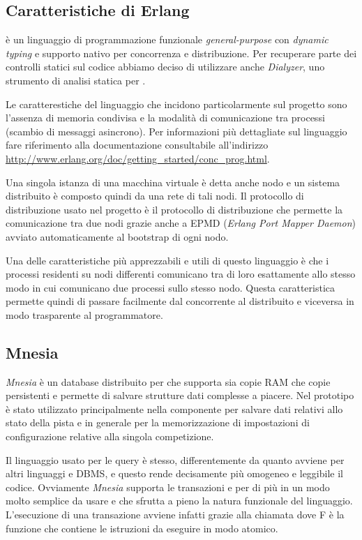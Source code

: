 \subsection*{Caratteristiche di Erlang}
\Erlang{} è un linguaggio di programmazione funzionale \textit{general-purpose} con \textit{dynamic typing} e supporto nativo per concorrenza e distribuzione. Per recuperare parte dei controlli statici sul codice abbiamo deciso di utilizzare anche \textsl{Dialyzer}, uno strumento di analisi statica per \Erlang{}.

Le caratterestiche del linguaggio che incidono particolarmente sul progetto sono l'assenza di memoria condivisa e la modalità di comunicazione tra processi (scambio di messaggi asincrono).
Per informazioni più dettagliate sul linguaggio fare riferimento alla documentazione consultabile all'indirizzo \url{http://www.erlang.org/doc/getting_started/conc_prog.html}.

Una singola istanza di una macchina virtuale \Erlang{} è detta anche nodo \Erlang{} e un sistema \Erlang{} distribuito è composto quindi da una rete di tali nodi. Il protocollo di distribuzione usato nel progetto è il protocollo di distribuzione \Erlang{} che permette la comunicazione tra due nodi \Erlang{} grazie anche a EPMD (\textsl{Erlang Port Mapper Daemon}) avviato automaticamente al bootstrap di ogni nodo.

Una delle caratteristiche più apprezzabili e utili di questo linguaggio è che i processi residenti su nodi differenti comunicano tra di loro esattamente allo stesso modo in cui comunicano due processi sullo stesso nodo. Questa caratteristica permette quindi di passare facilmente dal concorrente al distribuito e viceversa in modo trasparente al programmatore.

\subsection*{Mnesia}
\textsl{Mnesia} è un database distribuito per \Erlang{} che supporta sia copie RAM che copie persistenti e permette di salvare strutture dati complesse a piacere. Nel prototipo è stato utilizzato principalmente nella componente \track{} per salvare dati relativi allo stato della pista e in generale per la memorizzazione di impostazioni di configurazione relative alla singola competizione.

Il linguaggio usato per le query è \Erlang{} stesso, differentemente da quanto avviene per altri linguaggi e DBMS, e questo rende decisamente più omogeneo e leggibile il codice. Ovviamente \textsl{Mnesia} supporta le transazioni e per di più in un modo molto semplice da usare e che sfrutta a pieno la natura funzionale del linguaggio. L'esecuzione di una transazione avviene infatti grazie alla chiamata  dove F è la funzione che contiene le istruzioni da eseguire in modo atomico.

